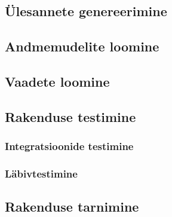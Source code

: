 \subsection{Ülesannete genereerimine}

\subsection{Andmemudelite loomine}

\subsection{Vaadete loomine}

\subsection{Rakenduse testimine}

\subsubsection{Integratsioonide testimine}

\subsubsection{Läbivtestimine}

\subsection{Rakenduse tarnimine}\label{subsec:cicd}

